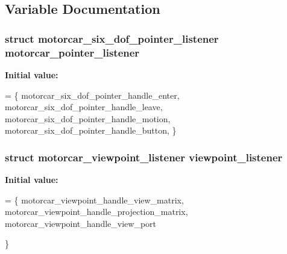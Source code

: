 \subsection{Variable Documentation}
\hypertarget{simple-egl_8cpp_a7bf478b9029897f63d189fc03f9957ad}{
\subsubsection[{motorcar\-\_\-pointer\-\_\-listener}]{\setlength{\rightskip}{0pt plus 5cm}struct {\bf motorcar\-\_\-six\-\_\-dof\-\_\-pointer\-\_\-listener} motorcar\-\_\-pointer\-\_\-listener}}\label{simple-egl_8cpp_a7bf478b9029897f63d189fc03f9957ad}
{\bfseries Initial value\-:}
\begin{DoxyCode}
= \{
    motorcar\_six\_dof\_pointer\_handle\_enter,
    motorcar\_six\_dof\_pointer\_handle\_leave,
    motorcar\_six\_dof\_pointer\_handle\_motion,
    motorcar\_six\_dof\_pointer\_handle\_button,
\}
\end{DoxyCode}
\hypertarget{simple-egl_8cpp_accee8e06dd6487760ee71ac0c347a035}{
\subsubsection[{viewpoint\-\_\-listener}]{\setlength{\rightskip}{0pt plus 5cm}struct {\bf motorcar\-\_\-viewpoint\-\_\-listener} viewpoint\-\_\-listener}}\label{simple-egl_8cpp_accee8e06dd6487760ee71ac0c347a035}
{\bfseries Initial value\-:}
\begin{DoxyCode}
= \{
    motorcar\_viewpoint\_handle\_view\_matrix,
    motorcar\_viewpoint\_handle\_projection\_matrix,
    motorcar\_viewpoint\_handle\_view\_port

\}
\end{DoxyCode}
